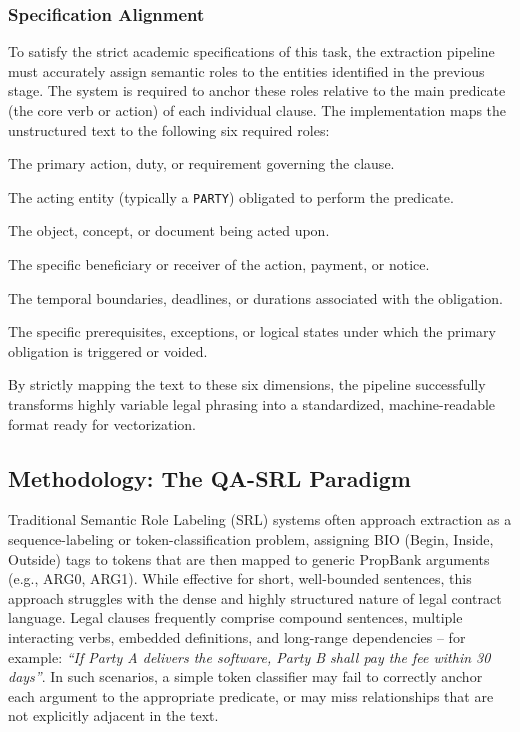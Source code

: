 \documentclass[twoside,final]{hcmut-report}
\begin{document}
\subsubsection*{Specification Alignment}
To satisfy the strict academic specifications of this task, the extraction pipeline must accurately assign semantic roles to the entities identified in the previous stage. The system is required to anchor these roles relative to the main predicate (the core verb or action) of each individual clause. The implementation maps the unstructured text to the following six required roles:

\begin{description}[leftmargin=2.4cm, style=nextline]
  \item[Predicate:] The primary action, duty, or requirement governing the clause.
  \item[Agent:] The acting entity (typically a \texttt{PARTY}) obligated to perform the predicate.
  \item[Theme:] The object, concept, or document being acted upon.
  \item[Recipient:] The specific beneficiary or receiver of the action, payment, or notice.
  \item[Time:] The temporal boundaries, deadlines, or durations associated with the obligation.
  \item[Condition:] The specific prerequisites, exceptions, or logical states under which the primary obligation is triggered or voided.
\end{description}

By strictly mapping the text to these six dimensions, the pipeline successfully transforms highly variable legal phrasing into a standardized, machine-readable format ready for vectorization.

\subsection{Methodology: The QA-SRL Paradigm}
Traditional Semantic Role Labeling (SRL) systems often approach extraction as a sequence-labeling or token-classification problem, assigning BIO (Begin, Inside, Outside) tags to tokens that are then mapped to generic PropBank arguments (e.g., ARG0, ARG1). While effective for short, well-bounded sentences, this approach struggles with the dense and highly structured nature of legal contract language. Legal clauses frequently comprise compound sentences, multiple interacting verbs, embedded definitions, and long-range dependencies -- for example: \emph{``If Party A delivers the software, Party B shall pay the fee within 30 days''}. In such scenarios, a simple token classifier may fail to correctly anchor each argument to the appropriate predicate, or may miss relationships that are not explicitly adjacent in the text.
\end{document}
